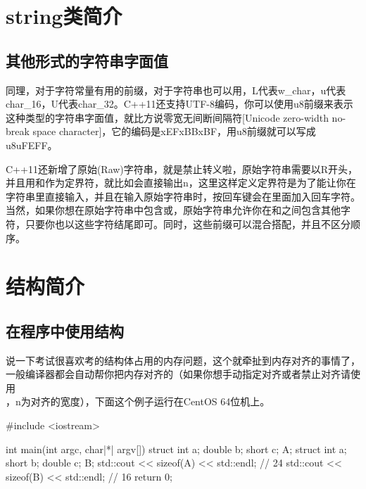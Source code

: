 \section{string类简介}

\addtocounter{subsection}{4}

\subsection{其他形式的字符串字面值}

同理，对于字符常量有用的前缀，对于字符串也可以用，L代表w\_char，u代表char\_16，U代表char\_32。C++11还支持UTF-8编码，你可以使用u8前缀来表示这种类型的字符串字面值，就比方说零宽无间断间隔符[Unicode zero-width no-break space character]，它的编码是\leftqm\mybackslash xEF\mybackslash xBB\mybackslash xBF\rightqm，用u8前缀就可以写成u8\leftqm\mybackslash uFEFF\rightqm。\dpar

C++11还新增了原始(Raw)字符串，就是禁止转义啦，原始字符串需要以R开头，并且用\thinspace{}\thinspace 和\thinspace{}\thinspace 作为定界符，就比如会直接输出\thinspace\mybackslash n，这里这样定义定界符是为了能让你在字符串里直接输入\thinspace{}\thinspace，并且在输入原始字符串时，按回车键会在里面加入回车字符。当然，如果你想在原始字符串中包含\thinspace{}\thinspace 或\thinspace{}\thinspace，原始字符串允许你在\thinspace{}\thinspace 和\thinspace\fira{(}\thinspace 之间包含其他字符，只要你也以这些字符结尾即可。同时，这些前缀可以混合搭配，并且不区分顺序。

\section{结构简介}

\subsection{在程序中使用结构}

说一下考试很喜欢考的结构体占用的内存问题，这个就牵扯到内存对齐的事情了，一般编译器都会自动帮你把内存对齐的（如果你想手动指定对齐或者禁止对齐请使用\\ ，n为对齐的宽度），下面这个例子运行在CentOS 64位机上。

\begin{cpp}
#include <iostream>

int main(int argc, char|*| argv[]) {
    struct {
        int a;
        double b;
        short c;
    } A;
    struct {
        int a;
        short b;
        double c;
    } B;
    std::cout << sizeof(A) << std::endl; // 24
    std::cout << sizeof(B) << std::endl; // 16
    return 0;
}
\end{cpp}

